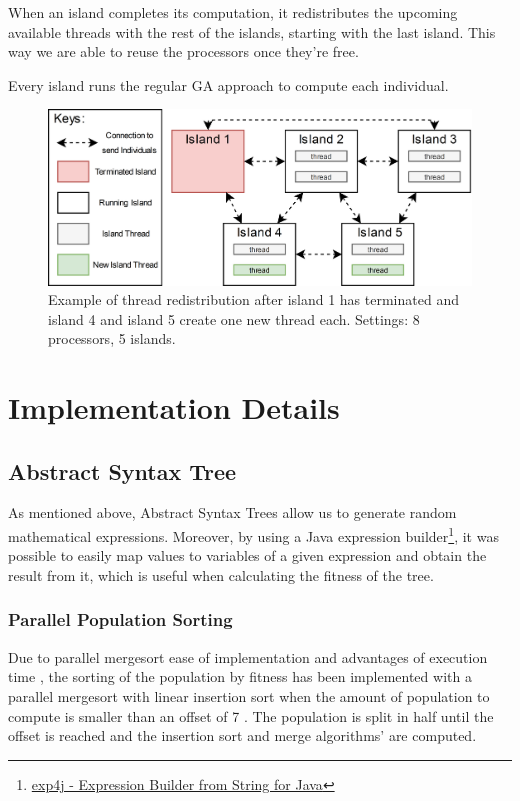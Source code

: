 \documentclass[runningheads]{llncs}
\begin{document}
When an island completes its computation, it redistributes the upcoming available threads with the rest of the islands, starting with the last island. This way we are able to reuse the processors once they're free.

Every island runs the regular GA approach to compute each individual.

\begin{figure}[htbp]
\centering
\includegraphics[width=.92\textwidth]{IslandModel.png}
\caption{Example of thread redistribution after island 1 has terminated and island 4 and island 5 create one new thread each. Settings: 8 processors, 5 islands.} \label{islandDiagram}
\end{figure}

\section{Implementation Details}

\subsection{Abstract Syntax Tree}

As mentioned above, Abstract Syntax Trees allow us to generate random mathematical expressions. Moreover, by using a Java expression builder\footnote{\href{https://www.objecthunter.net/exp4j/index.htm}{exp4j - Expression Builder from String for Java}}, it was possible to easily map values to variables of a given expression and obtain the result from it, which is useful when calculating the fitness of the tree.

\subsubsection{Parallel Population Sorting} \label{subsubsec:parallelSort} \hfill \par
Due to parallel mergesort ease of implementation and advantages of execution time \cite{analysisMergeSort}, the sorting of the population by fitness has been implemented with a parallel mergesort with linear insertion sort when the amount of population to compute is smaller than an offset of 7 .%
The population is split in half until the offset is reached and the insertion sort and merge algorithms' are computed.
\end{document}
